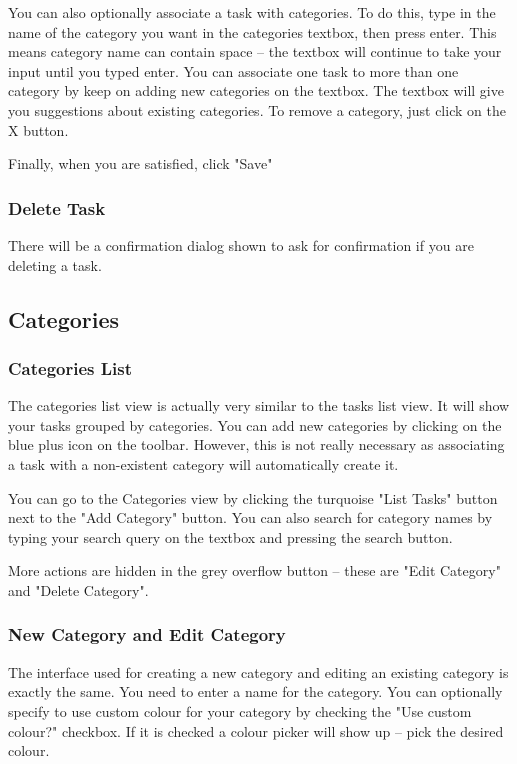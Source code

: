 \documentclass[12pt, a4paper]{article}
\begin{document}
		You can also optionally associate a task with categories. To do this, type in the name of the category you want in the categories textbox, then press enter. This means category name can contain space -- the textbox will continue to take your input until you typed enter. You can associate one task to more than one category by keep on adding new categories on the textbox. The textbox will give you suggestions about existing categories. To remove a category, just click on the X button.
		
		Finally, when you are satisfied, click "Save"
		
		\subsubsection{Delete Task}
		
		There will be a confirmation dialog shown to ask for confirmation if you are deleting a task.
		
		\subsection{Categories}
		
		\subsubsection{Categories List}
		The categories list view is actually very similar to the tasks list view. It will show your tasks grouped by categories. You can add new categories by clicking on the blue plus icon on the toolbar. However, this is not really necessary as associating a task with a non-existent category will automatically create it.
		
		You can go to the Categories view by clicking the turquoise "List Tasks" button next to the "Add Category" button. You can also search for category names by typing your search query on the textbox and pressing the search button.
		
		More actions are hidden in the grey overflow button -- these are "Edit Category" and "Delete Category".
		
		\subsubsection{New Category and Edit Category}
		The interface used for creating a new category and editing an existing category is exactly the same. You need to enter a name for the category. You can optionally specify to use custom colour for your category by checking the "Use custom colour?" checkbox. If it is checked a colour picker will show up -- pick the desired colour.
		
\end{document}
